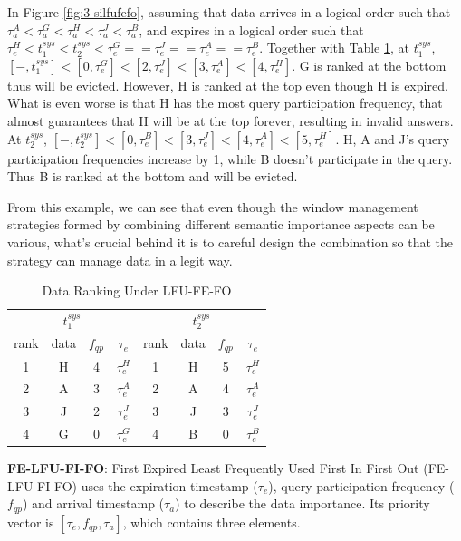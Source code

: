 In Figure \ref{fig:3-silfufefo}, assuming that data arrives in a logical order such that $\tau^{A}_{a} < \tau^{G}_{a} < \tau^{H}_{a} < \tau^{J}_{a} < \tau^{B}_{a}$, and expires in a logical order such that $\tau^{H}_{e} < t^{sys}_{1} < t^{sys}_{2} < \tau^{G}_{e} == \tau^{J}_{e} == \tau^{A}_{e} == \tau^{B}_{e}$. 
Together with Table \ref{tab:lfufefo}, at $t^{sys}_{1}$, $[-, t^{sys}_{1}] < [0, \tau^{G}_{e}] < [2, \tau^{J}_{e}] < [3, \tau^{A}_{e}] < [4, \tau^{H}_{e}]$. 
G is ranked at the bottom thus will be evicted.
However, H is ranked at the top even though H is expired. 
What is even worse is that H has the most query participation frequency, that almost guarantees that H will be at the top forever, resulting in invalid answers.
At $t^{sys}_{2}$, $[-, t^{sys}_{2}] < [0, \tau^{B}_{e}] < [3, \tau^{J}_{e}] < [4, \tau^{A}_{e}] < [5, \tau^{H}_{e}]$.
H, A and J's query participation frequencies increase by 1, while B doesn't participate in the query.
Thus B is ranked at the bottom and will be evicted. 

From this example, we can see that even though the window management strategies formed by combining different semantic importance aspects can be various, what's crucial behind it is to careful design the combination so that the strategy can manage data in a legit way. 

\begin{table}[!htbp]
\centering
\caption{Data Ranking Under LFU-FE-FO}
\label{tab:lfufefo}
\begin{tabular}{|c|c|c|c||c|c|c|c|}
\hline
\multicolumn{4}{|c||}{$t^{sys}_{1}$} & \multicolumn{4}{c|}{$t^{sys}_{2}$} \\ \hhline{|========|}
rank & data & $f_{qp}$ & $\tau_{e}$ & rank & data & $f_{qp}$ & $\tau_{e}$ \\ \hhline{|=|=|=|=#=|=|=|=|}
1 & H & 4 & $\tau^{H}_{e}$ & 1 & H & 5 & $\tau^{H}_{e}$ \\ \hline
2 & A & 3 & $\tau^{A}_{e}$ & 2 & A & 4 & $\tau^{A}_{e}$ \\ \hline
3 & J & 2 & $\tau^{J}_{e}$ & 3 & J & 3 & $\tau^{J}_{e}$ \\ \hline
4 & G & 0 & $\tau^{G}_{e}$ & 4 & B & 0 & $\tau^{B}_{e}$ \\ \hline
\end{tabular}
\end{table}

\textbf{FE-LFU-FI-FO}:
First Expired Least Frequently Used First In First Out (FE-LFU-FI-FO) uses the expiration timestamp ($\tau_{e}$), query participation frequency ($f_{qp}$) and arrival timestamp ($\tau_{a}$) to describe the data importance.
Its priority vector is $[\tau_{e}, f_{qp}, \tau_{a}]$, which contains three elements.

